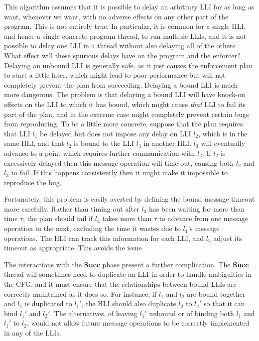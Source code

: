 This algorithm assumes that it is possible to delay an arbitrary LLI
for as long as want, whenever we want, with no adverse effects on any
other part of the program.  This is not entirely true.  In particular,
it is common for a single HLI, and hence a single concrete program
thread, to run multiple LLIs, and it is not possible to delay one LLI
in a thread without also delaying all of the others.  What effect will
these spurious delays have on the program and the enforcer?  Delaying
an unbound LLI is generally safe, as it just causes the enforcement
plan to start a little later, which might lead to poor performance but
will not completely prevent the plan from succeeding.  Delaying a
bound LLI is much more dangerous.  The problem is that delaying a
bound LLI will have knock-on effects on the LLI to which it has bound,
which might cause \emph{that} LLI to fail its part of the plan, and in
the extreme case might completely prevent certain bugs from
reproducing.  To be a little more concrete, suppose that the plan
requires that LLI $l_1$ be delayed but does not impose any delay on
LLI $l_2$, which is in the same HLI, and that $l_2$ is bound to the
LLI $l_3$ in another HLI.  $l_3$ will eventually advance to a point
which requires further communication with $l_2$.  If $l_2$ is
excessively delayed then this message operation will time out, causing
both $l_2$ and $l_3$ to fail.  If this happens consistently then it
might make it impossible to reproduce the bug.

Fortunately, this problem is easily averted by defining the bound
message timeout more carefully.  Rather than timing out after $l_3$
has been waiting for more than time $\tau$, the plan should fail if
$l_2$ takes more than $\tau$ to advance from one message operation to
the next, excluding the time it wastes due to $l_1$'s message
operations.  The HLI can track this information for each LLI, and
$l_3$ adjust its timeout as appropriate.  This avoids the
issue.

The interactions with the \textbf{Succ} phase present a further
complication.  The \textbf{Succ} thread will sometimes need to
duplicate an LLI in order to handle ambiguities in the CFG, and it
must ensure that the relationships between bound LLIs are correctly
maintained as it does so.  For instance, if $l_1$ and $l_2$ are bound
together and $l_1$ is duplicated to $l_1'$, the HLI should also
duplicate $l_2$ to $l_2'$ so that it can bind $l_1'$ and $l_2'$.  The
alternatives, of leaving $l_1'$ unbound or of binding both $l_1$ and
$l_1'$ to $l_2$, would not allow future message operations to be
correctly implemented in any of the LLIs.


